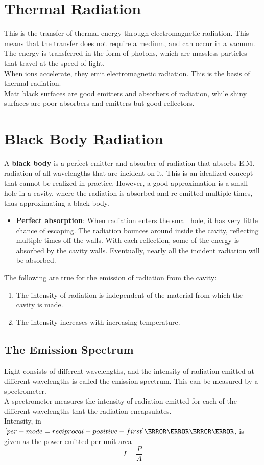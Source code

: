 \documentclass[a4paper,12pt]{article}
\let\oldsection\section
\renewcommand\section{\clearpage\oldsection}
\let\oldsi\si
\renewcommand{\si}[1]{\oldsi[per-mode=reciprocal-positive-first]{#1}}
\newcommand{\lb}{\\[8pt]}
\begin{document}
\section{Thermal Radiation}

This is the transfer of thermal energy through electromagnetic radiation. This means that the transfer does not require a medium, and can occur in a vacuum. The energy is transferred in the form of photons, which are massless particles that travel at the speed of light.\lb
When ions accelerate, they emit electromagnetic radiation. This is the basis of thermal radiation.\lb
Matt black surfaces are good emitters and absorbers of radiation, while shiny surfaces are poor absorbers and emitters but good reflectors.

\section{Black Body Radiation}

A \textbf{black body} is a perfect emitter and absorber of radiation that absorbs E.M. radiation of all wavelengths that are incident on it. This is an idealized concept that cannot be realized in practice. However, a good approximation is a small hole in a cavity, where the radiation is absorbed and re-emitted multiple times, thus approximating a black body.
\begin{itemize}
  \item \textbf{Perfect absorption}: When radiation enters the small hole, it has very little chance of escaping. The radiation bounces around inside the cavity, reflecting multiple times off the walls. With each reflection, some of the energy is absorbed by the cavity walls. Eventually, nearly all the incident radiation will be absorbed.
\end{itemize}
The following are true for the emission of radiation from the cavity:
\begin{enumerate}
  \item The intensity of radiation is independent of the material from which the cavity is made.
  \item The intensity increases with increasing temperature.
\end{enumerate}

\subsection{The Emission Spectrum}

Light consists of different wavelengths, and the intensity of radiation emitted at different wavelengths is called the emission spectrum. This can be measured by a spectrometer.\lb
A spectrometer measures the intensity of radiation emitted for each of the different wavelengths that the radiation encapsulates.\lb
Intensity, in $\si{\W\per\m\squared}$, is given as the power emitted per unit area
$$I = \frac{P}{A}$$
\end{document}
